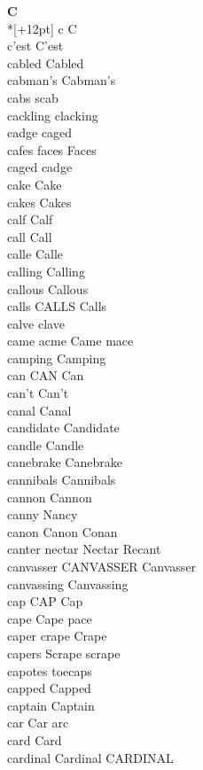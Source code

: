 \vspace{14pt}
\noindent\textbf{\Large C}\\*[+12pt]
c C\\
c'est C'est\\
cabled Cabled\\
cabman's Cabman's\\
cabs scab\\
cackling clacking\\
cadge caged\\
cafes faces Faces\\
caged cadge\\
cake Cake\\
cakes Cakes\\
calf Calf\\
call Call\\
calle Calle\\
calling Calling\\
callous Callous\\
calls CALLS Calls\\
calve clave\\
came acme Came mace\\
camping Camping\\
can CAN Can\\
can't Can't\\
canal Canal\\
candidate Candidate\\
candle Candle\\
canebrake Canebrake\\
cannibals Cannibals\\
cannon Cannon\\
canny Nancy\\
canon Canon Conan\\
canter nectar Nectar Recant\\
canvasser CANVASSER Canvasser\\
canvassing Canvassing\\
cap CAP Cap\\
cape Cape pace\\
caper crape Crape\\
capers Scrape scrape\\
capotes toecaps\\
capped Capped\\
captain Captain\\
car Car arc\\
card Card\\
cardinal Cardinal CARDINAL\\
